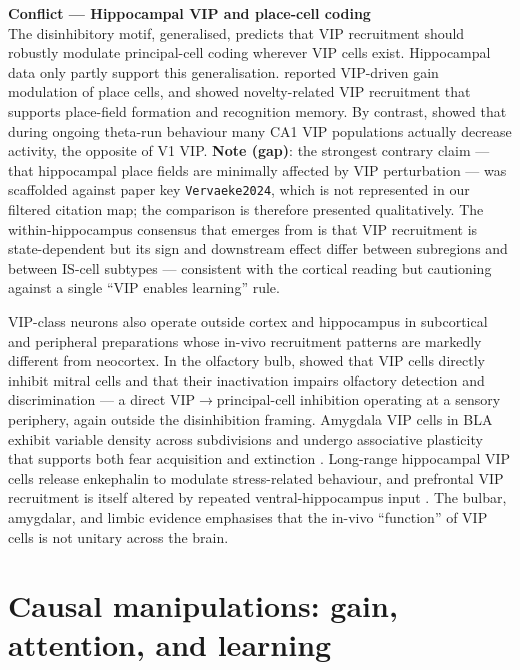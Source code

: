 \documentclass[11pt]{article}
\let\origrightarrow\rightarrow
\def\rightarrow{\ensuremath{\origrightarrow}}
\begin{document}
\begin{framed}
\textbf{Conflict --- Hippocampal VIP and place-cell coding}\\
The disinhibitory \citet{Fu2014} motif, generalised, predicts that VIP recruitment should robustly modulate principal-cell coding wherever VIP cells exist. Hippocampal data only partly support this generalisation. \citet{Lenkey2025} reported VIP-driven gain modulation of place cells, and \citet{Tamboli2024, Neubrandt2025a} showed novelty-related VIP recruitment that supports place-field formation and recognition memory. By contrast, \citet{Francavilla2018a, Luo2020} showed that during ongoing theta-run behaviour many CA1 VIP populations actually decrease activity, the opposite of V1 VIP. \textbf{Note (gap)}: the strongest contrary claim --- that hippocampal place fields are minimally affected by VIP perturbation --- was scaffolded against paper key \texttt{Vervaeke2024}, which is not represented in our filtered citation map; the comparison is therefore presented qualitatively. The within-hippocampus consensus that emerges from \citep{Turi2019, Francavilla2018a, Luo2020, Tamboli2024, Neubrandt2025a, Lenkey2025} is that VIP recruitment is state-dependent but its sign and downstream effect differ between subregions and between IS-cell subtypes --- consistent with the cortical reading but cautioning against a single ``VIP enables learning'' rule.
\end{framed}

VIP-class neurons also operate outside cortex and hippocampus in subcortical and peripheral preparations whose in-vivo recruitment patterns are markedly different from neocortex. In the olfactory bulb, \citet{Wang2022} showed that VIP cells directly inhibit mitral cells and that their inactivation impairs olfactory detection and discrimination --- a direct VIP\rightarrow principal-cell inhibition operating at a sensory periphery, again outside the disinhibition framing. Amygdala VIP cells in BLA exhibit variable density across subdivisions \citep{Rhomberg2018} and undergo associative plasticity that supports both fear acquisition and extinction \citep{Favila2025}. Long-range hippocampal VIP cells release enkephalin to modulate stress-related behaviour, and prefrontal VIP recruitment is itself altered by repeated ventral-hippocampus input \citep{Silverstein2025}. The bulbar, amygdalar, and limbic evidence emphasises that the in-vivo ``function'' of VIP cells is not unitary across the brain.

\section{Causal manipulations: gain, attention, and learning}
\end{document}
